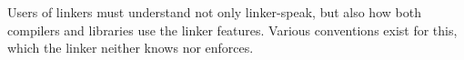 % 
% 
% 
% 
% 
%     
% 



Users of linkers must understand not only linker-speak, but also 
how both compilers and libraries use the linker features.
Various conventions exist for this, which the linker neither knows nor enforces.

